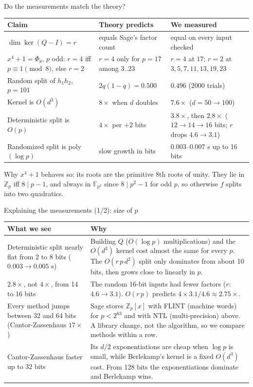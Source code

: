 \documentclass[aspectratio=169,11pt]{beamer}
\newcommand{\Zp}{\mathbb{Z}_p}
\newcommand{\Zpx}{\mathbb{Z}_p[x]}
\newcommand{\aside}[1]{{\color{muted}\small #1}}
\begin{document}
\begin{frame}{Do the measurements match the theory?}
  \small
  \begin{tabular}{@{}L{0.34\textwidth}L{0.28\textwidth}L{0.32\textwidth}@{}}
    \toprule
    \textbf{Claim} & \textbf{Theory predicts} & \textbf{We measured} \\
    \midrule
    $\dim \ker(Q - I) = r$ & equals Sage's factor count & equal on every input checked \\
    $x^4 + 1 = \Phi_8$, $p$ odd: $r = 4$ iff $p \equiv 1 \pmod 8$, else $r = 2$ & $r = 4$ only for $p = 17$ among $3..23$ & $r = 4$ at $17$; $r = 2$ at $3, 5, 7, 11, 13, 19, 23$ \\
    Random split of $h_1 h_2$, $p = 101$ & $2q(1-q) = 0.500$ & $0.496$ (2000 trials) \\
    Kernel is $O(d^3)$ & $8\times$ when $d$ doubles & $7.6\times$ ($d = 50 \to 100$) \\
    Deterministic split is $O(p)$ & $4\times$ per $+2$ bits & $3.8\times$, then $2.8\times$ ($12 \to 14 \to 16$ bits; $r$ drops $4.6 \to 3.1$) \\
    Randomized split is poly$(\log p)$ & slow growth in bits & $0.003$--$0.007$ s up to 16 bits \\
    \bottomrule
  \end{tabular}
  \medskip
  \aside{Why $x^4 + 1$ behaves so: its roots are the primitive 8th roots of unity. They lie in $\Zp$ iff $8 \mid p - 1$,
  and always in $\mathbb{F}_{p^2}$ since $8 \mid p^2 - 1$ for odd $p$, so otherwise $f$ splits into two quadratics.}
\end{frame}

\begin{frame}{Explaining the measurements (1/2): size of $p$}
  \small
  \renewcommand{\arraystretch}{1.2}
  \begin{tabular}{@{}L{0.31\textwidth}L{0.65\textwidth}@{}}
    \toprule
    \textbf{What we see} & \textbf{Why} \\
    \midrule
    Deterministic split nearly flat from 2 to 8 bits ($0.003 \to 0.005$ s) &
      Building $Q$ ($O(\log p)$ multiplications) and the $O(d^3)$ kernel cost almost the same for every $p$. The $O(r\,p\,d^2)$ split only dominates from about 10 bits, then grows close to linearly in $p$. \\
    $2.8\times$, not $4\times$, from 14 to 16 bits &
      The random 16-bit inputs had fewer factors ($r$: $4.6 \to 3.1$). $O(r\,p)$ predicts $4 \times 3.1/4.6 \approx 2.75\times$. \\
    Every method jumps between 32 and 64 bits (Cantor-Zassenhaus $17\times$) &
      Sage stores $\Zpx$ with FLINT (machine words) for $p < 2^{63}$ and with NTL (multi-precision) above. A library change, not the algorithm, so we compare methods within a row. \\
    Cantor-Zassenhaus faster up to 32 bits &
      Its $d/2$ exponentiations are cheap when $\log p$ is small, while Berlekamp's kernel is a fixed $O(d^3)$ cost. From 128 bits the exponentiations dominate and Berlekamp wins. \\
    \bottomrule
  \end{tabular}
\end{frame}
\end{document}
